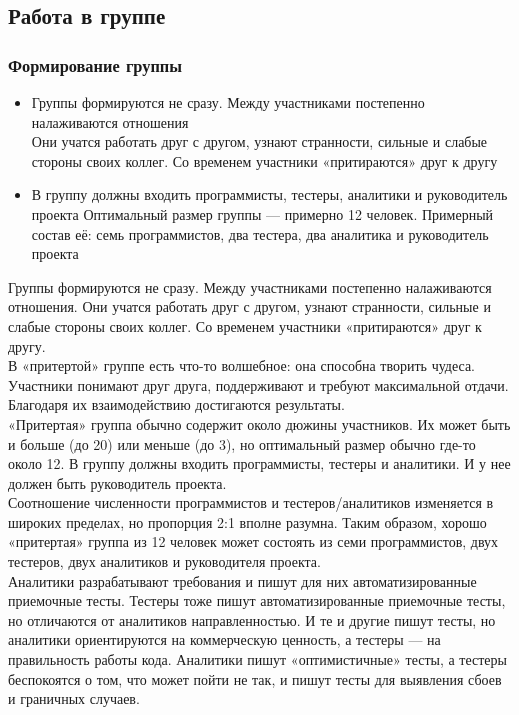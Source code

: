 \documentclass{../industrial-development}
\begin{document}
\subsection{Работа в группе}
\begin{frame} \frametitle{Формирование группы}
\begin{itemize}
  \item Группы формируются не сразу. Между участниками постепенно налаживаются отношения\\
	Они учатся работать друг с другом, узнают странности, сильные и слабые стороны своих коллег. Со временем участники «притираются» друг к другу
  \item В группу должны входить программисты, тестеры, аналитики и руководитель проекта
	Оптимальный размер группы --- примерно 12 человек. Примерный состав её: семь программистов, два тестера, два аналитика и руководитель проекта
\end{itemize}
\end{frame}
\lecturenotes
Группы формируются не сразу. Между участниками постепенно налаживаются отношения. Они учатся работать друг с другом, узнают странности, сильные и слабые стороны своих коллег. Со временем участники «притираются» друг к другу.\\
В «притертой» группе есть что-то волшебное: она способна творить чудеса. Участники понимают друг друга, поддерживают и требуют максимальной отдачи. Благодаря их взаимодействию достигаются результаты.\\
«Притертая» группа обычно содержит около дюжины участников. Их может быть и больше (до 20) или меньше (до 3), но оптимальный размер обычно где-то около 12. В группу должны входить программисты, тестеры и аналитики. И у нее должен быть руководитель проекта.\\
Соотношение численности программистов и тестеров/аналитиков изменяется в широких пределах, но пропорция 2:1 вполне разумна. Таким образом, хорошо «притертая» группа из 12 человек может состоять из семи программистов, двух тестеров, двух аналитиков и руководителя проекта.\\
Аналитики разрабатывают требования и пишут для них автоматизированные приемочные тесты. Тестеры тоже пишут автоматизированные приемочные тесты, но отличаются от аналитиков направленностью. И те и другие пишут тесты, но аналитики ориентируются на коммерческую ценность, а тестеры — на правильность работы кода. Аналитики пишут «оптимистичные» тесты, а тестеры беспокоятся о том, что
может пойти не так, и пишут тесты для выявления сбоев и граничных случаев.\\
\end{document}
